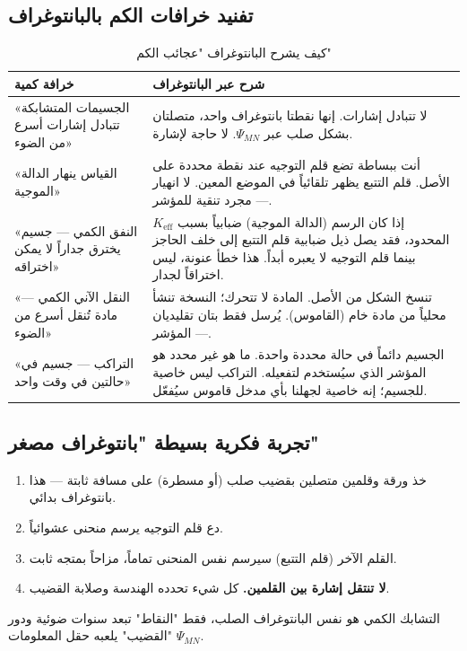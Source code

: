\documentclass[11pt,a4paper]{article}
\begin{document}
	\subsection{تفنيد خرافات الكم بالبانتوغراف}
	
	\begin{table}[htbp]
		\centering
		\caption{كيف يشرح البانتوغراف "عجائب الكم"}
		\label{tab:myths}
		\begin{tabular}{|p{4.5cm}|p{9cm}|}
			\hline
			\textbf{خرافة كمية} & \textbf{شرح عبر البانتوغراف} \\
			\hline
			«الجسيمات المتشابكة تتبادل إشارات أسرع من الضوء» & لا تتبادل إشارات. إنها نقطتا بانتوغراف واحد، متصلتان بشكل صلب عبر \(\Psi_{MN}\). لا حاجة لإشارة. \\
			\hline
			«القياس ينهار الدالة الموجية» & أنت ببساطة تضع قلم التوجيه عند نقطة محددة على الأصل. قلم التتبع يظهر تلقائياً في الموضع المعين. لا انهيار — مجرد تنقية للمؤشر. \\
			\hline
			«النفق الكمي — جسيم يخترق جداراً لا يمكن اختراقه» & إذا كان الرسم (الدالة الموجية) ضبابياً بسبب \(K_{\mathrm{eff}}\) المحدود، فقد يصل ذيل ضبابية قلم التتبع إلى خلف الحاجز بينما قلم التوجيه لا يعبره أبداً. هذا خطأ عنونة، ليس اختراقاً لجدار. \\
			\hline
			«النقل الآني الكمي — مادة تُنقل أسرع من الضوء» & تنسخ الشكل من الأصل. المادة لا تتحرك؛ النسخة تنشأ محلياً من مادة خام (القاموس). يُرسل فقط بتان تقليديان — المؤشر. \\
			\hline
			«التراكب — جسيم في حالتين في وقت واحد» & الجسيم دائماً في حالة محددة واحدة. ما هو غير محدد هو المؤشر الذي سيُستخدم لتفعيله. التراكب ليس خاصية للجسيم؛ إنه خاصية لجهلنا بأي مدخل قاموس سيُفعّل. \\
			\hline
		\end{tabular}
	\end{table}
	
	\subsection{تجربة فكرية بسيطة "بانتوغراف مصغر"}
	
	\begin{enumerate}
		\item خذ ورقة وقلمين متصلين بقضيب صلب (أو مسطرة) على مسافة ثابتة — هذا بانتوغراف بدائي.
		\item دع قلم التوجيه يرسم منحنى عشوائياً.
		\item القلم الآخر (قلم التتبع) سيرسم نفس المنحنى تماماً، مزاحاً بمتجه ثابت.
		\item \textbf{لا تنتقل إشارة بين القلمين.} كل شيء تحدده الهندسة وصلابة القضيب.
	\end{enumerate}
	التشابك الكمي هو نفس البانتوغراف الصلب، فقط "النقاط" تبعد سنوات ضوئية ودور "القضيب" يلعبه حقل المعلومات \(\Psi_{MN}\).
	
\end{document}
